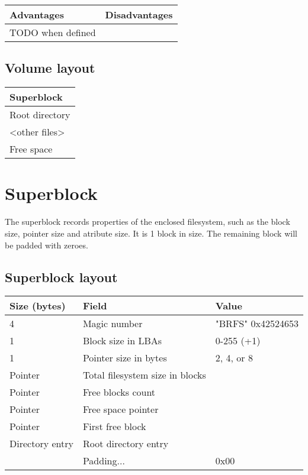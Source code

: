 \documentclass[]{article}
\begin{document}
	\begin{tabularx}{\textwidth}{X|X}
		\textbf{Advantages} & \textbf{Disadvantages} \\
		\hline
		TODO when defined
	\end{tabularx}

	\subsection{Volume layout}

	\begin{tabular}{|l|} 
		\hline
		Superblock \\ 
		\hline	
		Root directory \\
		\hline
		\textless other files\textgreater \\
		\hline
		Free space \\
		\hline
	\end{tabular}

	\section{Superblock}
	
	The superblock records properties of the enclosed filesystem, such as the block size, pointer size and atribute size. It is 1 block in size. The remaining block will be padded with zeroes.
	
	\subsection{Superblock layout}
	
	\begin{tabular}{|l|l|l|} 
		\hline
		\textbf{Size (bytes)} & \textbf{Field} & \textbf{Value} \\ [0.5ex] 
		\hline
		4 & Magic number & "BRFS" 0x42524653  \\ 
		\hline
		1 & Block size in LBAs & 0-255 (+1) \\
		\hline
		1 & Pointer size in bytes & 2, 4, or 8 \\
		\hline
		Pointer & Total filesystem size in blocks & \\
		\hline
		Pointer & Free blocks count & \\
		\hline
		Pointer & Free space pointer & \\
		\hline
		Pointer & First free block & \\
		\hline
		Directory entry & Root directory entry & \\
		\hline
		 & Padding... & 0x00 \\
		\hline	
	\end{tabular}
\end{document}
